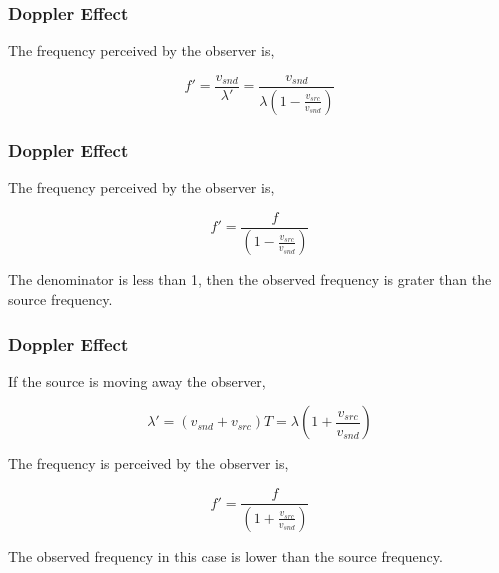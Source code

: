 \documentclass[]{beamer}
\begin{document}
\begin{frame}
\frametitle{Doppler Effect}


The frequency perceived by the observer is,

\begin{equation}
f'=\frac{v_{snd}}{\lambda '}=\frac{v_{snd}}{\lambda(1-\frac{v_{src}}{v_{snd}})}
\end{equation}


  \end{frame}


\begin{frame}
\frametitle{Doppler Effect}


The frequency perceived by the observer is,

\begin{equation}
f'=\frac{f}{(1-\frac{v_{src}}{v_{snd}})}
\end{equation}


The denominator is less than 1, then the observed frequency is grater than the source frequency.

  \end{frame}







\begin{frame}
\frametitle{Doppler Effect}


If the source is moving away the observer,

\begin{equation}
\lambda'=(v_{snd}+v_{src})T=\lambda(1+\frac{v_{src}}{v_{snd}})
\end{equation}

\pause

The frequency is perceived by the observer is,

\pause

\begin{equation}
f'=\frac{f}{(1+\frac{v_{src}}{v_{snd}})}
\end{equation}

\pause

The observed frequency in this case is lower than the source frequency.


  \end{frame}
\end{document}
